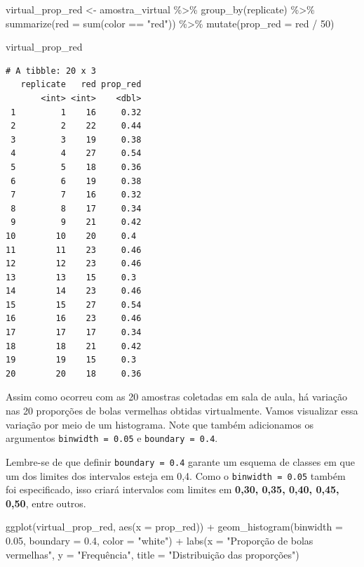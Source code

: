 \documentclass[
  letterpaper,
  DIV=11,
  numbers=noendperiod]{scrreprt}
\newenvironment{Shaded}{\begin{snugshade}}{\end{snugshade}}
\newcommand{\AttributeTok}[1]{\textcolor[rgb]{0.40,0.45,0.13}{#1}}
\newcommand{\DecValTok}[1]{\textcolor[rgb]{0.68,0.00,0.00}{#1}}
\newcommand{\FloatTok}[1]{\textcolor[rgb]{0.68,0.00,0.00}{#1}}
\newcommand{\FunctionTok}[1]{\textcolor[rgb]{0.28,0.35,0.67}{#1}}
\newcommand{\NormalTok}[1]{\textcolor[rgb]{0.00,0.23,0.31}{#1}}
\newcommand{\OtherTok}[1]{\textcolor[rgb]{0.00,0.23,0.31}{#1}}
\newcommand{\SpecialCharTok}[1]{\textcolor[rgb]{0.37,0.37,0.37}{#1}}
\newcommand{\StringTok}[1]{\textcolor[rgb]{0.13,0.47,0.30}{#1}}
\begin{document}
\begin{Shaded}
\begin{Highlighting}[]
\NormalTok{virtual\_prop\_red }\OtherTok{\textless{}{-}}\NormalTok{ amostra\_virtual }\SpecialCharTok{\%\textgreater{}\%}
\FunctionTok{group\_by}\NormalTok{(replicate) }\SpecialCharTok{\%\textgreater{}\%}
\FunctionTok{summarize}\NormalTok{(}\AttributeTok{red =} \FunctionTok{sum}\NormalTok{(color }\SpecialCharTok{==} \StringTok{"red"}\NormalTok{)) }\SpecialCharTok{\%\textgreater{}\%}
\FunctionTok{mutate}\NormalTok{(}\AttributeTok{prop\_red =}\NormalTok{ red }\SpecialCharTok{/} \DecValTok{50}\NormalTok{)}

\NormalTok{virtual\_prop\_red}
\end{Highlighting}
\end{Shaded}

\begin{verbatim}
# A tibble: 20 x 3
   replicate   red prop_red
       <int> <int>    <dbl>
 1         1    16     0.32
 2         2    22     0.44
 3         3    19     0.38
 4         4    27     0.54
 5         5    18     0.36
 6         6    19     0.38
 7         7    16     0.32
 8         8    17     0.34
 9         9    21     0.42
10        10    20     0.4 
11        11    23     0.46
12        12    23     0.46
13        13    15     0.3 
14        14    23     0.46
15        15    27     0.54
16        16    23     0.46
17        17    17     0.34
18        18    21     0.42
19        19    15     0.3 
20        20    18     0.36
\end{verbatim}

Assim como ocorreu com as 20 amostras coletadas em sala de aula, há
variação nas 20 proporções de bolas vermelhas obtidas virtualmente.
Vamos visualizar essa variação por meio de um histograma. Note que
também adicionamos os argumentos \texttt{binwidth\ =\ 0.05} e
\texttt{boundary\ =\ 0.4}.

Lembre-se de que definir \texttt{boundary\ =\ 0.4} garante um esquema de
classes em que um dos limites dos intervalos esteja em 0,4. Como o
\texttt{binwidth\ =\ 0.05} também foi especificado, isso criará
intervalos com limites em \textbf{0,30, 0,35, 0,40, 0,45, 0,50}, entre
outros.

\begin{Shaded}
\begin{Highlighting}[]
\FunctionTok{ggplot}\NormalTok{(virtual\_prop\_red, }\FunctionTok{aes}\NormalTok{(}\AttributeTok{x =}\NormalTok{ prop\_red)) }\SpecialCharTok{+}
\FunctionTok{geom\_histogram}\NormalTok{(}\AttributeTok{binwidth =} \FloatTok{0.05}\NormalTok{, }\AttributeTok{boundary =} \FloatTok{0.4}\NormalTok{, }\AttributeTok{color =} \StringTok{"white"}\NormalTok{) }\SpecialCharTok{+}
\FunctionTok{labs}\NormalTok{(}\AttributeTok{x =} \StringTok{"Proporção de bolas vermelhas"}\NormalTok{, }\AttributeTok{y =} \StringTok{"Frequência"}\NormalTok{,}
\AttributeTok{title =} \StringTok{"Distribuição das proporções"}\NormalTok{) }
\end{Highlighting}
\end{Shaded}
\end{document}
